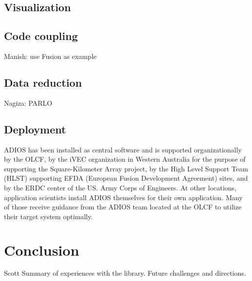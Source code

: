 \subsection{Visualization}



\subsection{Code coupling}
{\color {red}Manish: use Fusion as example}



\subsection{Data reduction}
{\color {red}Nagiza: PARLO}




\subsection{Deployment}
ADIOS has been installed as central software and is supported organizationally by the OLCF, by the iVEC organization in Western Australia for the purpose of supporting the Square-Kilometer Array project, by the High Level Support Team (HLST) supporting EFDA (European Fusion Development Agreement) sites, and by the ERDC center of the US. Army Corps of Engineers. At other locations, application scientists install ADIOS themselves for their own application. Many of those receive guidance from the ADIOS team located at the OLCF to utilize their target system optimally.





\section{Conclusion}
{\color {red}Scott}
{\color {red}Summary of experiences with the library. Future challenges and directions.}


